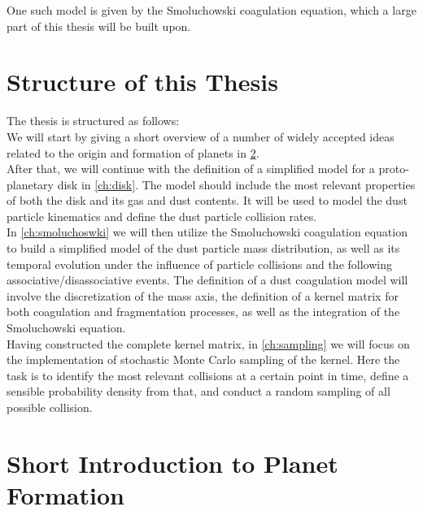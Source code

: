 One such model is given by the Smoluchowski coagulation equation, which a large part of this 
thesis will be built upon. 

\section{Structure of this Thesis}

The thesis is structured as follows: \\

We will start by giving a short overview of a number of widely accepted ideas
related to the origin and formation of planets in \cref{sec:prerequisites}. \\

After that, we will continue with the definition of a simplified model for a proto-planetary
disk in \cref{ch:disk}. The model should include the most relevant properties of both the disk and 
its gas and dust contents. It will be used to model the dust particle kinematics and define the dust 
particle collision rates. \\

In \cref{ch:smoluchoswki} we will then utilize the Smoluchowski coagulation equation to build a 
simplified model of the dust particle mass distribution, as well as its temporal evolution under 
the influence of particle collisions and the following associative/disassociative events. 
The definition of a dust coagulation model will involve the discretization of the mass axis, 
the definition of a kernel matrix for both coagulation and fragmentation processes,
as well as the integration of the Smoluchowski equation. \\

Having constructed the complete kernel matrix, in \cref{ch:sampling} we will focus on the 
implementation of stochastic Monte Carlo sampling of the kernel. 
Here the task is to identify the most relevant collisions at a certain point in time,
define a sensible probability density from that, 
and conduct a random sampling of all possible collision.

\section{Short Introduction to Planet Formation}
\label{sec:prerequisites}


